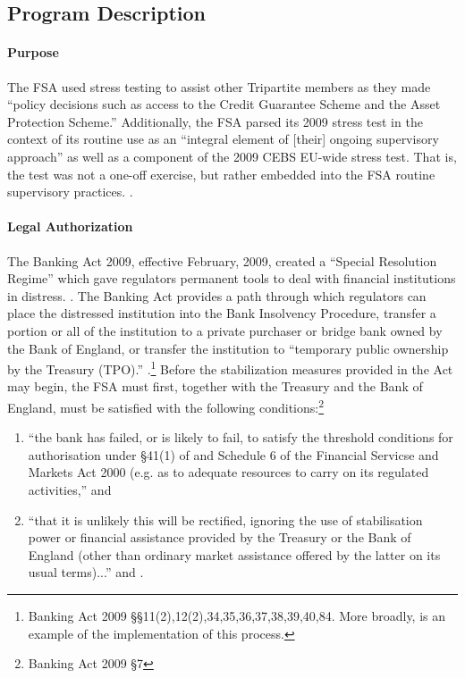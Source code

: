 \documentclass[12pt]{article}
\begin{document}
\subsection{Program Description}

\paragraph{Purpose}

The FSA used stress testing to assist other Tripartite members as they made ``policy decisions such as access to the Credit Guarantee Scheme and the Asset Protection Scheme.'' Additionally, the FSA parsed its 2009 stress test in the context of its routine use as an ``integral element of [their] ongoing supervisory approach'' as well as a component of the 2009 CEBS EU-wide stress test. That is, the test was not a one-off exercise, but rather embedded into the FSA routine supervisory practices. \citep{Results}.

\paragraph{Legal Authorization}

The Banking Act 2009, effective February, 2009, created a ``Special Resolution Regime'' which gave regulators permanent tools to deal with financial institutions in distress. \citep{BankingAct}. The Banking Act provides a path through which regulators can place the distressed institution into the Bank Insolvency Procedure, transfer a portion or all of the institution to a private purchaser or bridge bank owned by the Bank of England, or transfer the institution to ``temporary public ownership by the Treasury (TPO).'' \citep{DunfermlinePress}.\footnote{Banking Act 2009 \S \S 11(2),12(2),34,35,36,37,38,39,40,84. More broadly, \citet{Dunfermline} is an example of the implementation of this process. } Before the stabilization measures provided in the Act may begin, the FSA must first, together with the Treasury and the Bank of England, must be satisfied with the following conditions:\footnote{Banking Act 2009 \S 7}

\begin{enumerate}
\item ``the bank has failed, or is likely to fail, to satisfy the threshold conditions for authorisation under \S 41(1) of and Schedule 6 of the Financial Servicse and Markets Act 2000 (e.g. as to adequate resources to carry on its regulated activities,'' and
\item ``that it is unlikely this will be rectified, ignoring the use of stabilisation power or financial assistance provided by the Treasury or the Bank of England (other than ordinary market assistance offered by the latter on its usual terms)...'' \citep{BankingAct} and \citep{McKnight}.
\end{enumerate}
\end{document}
